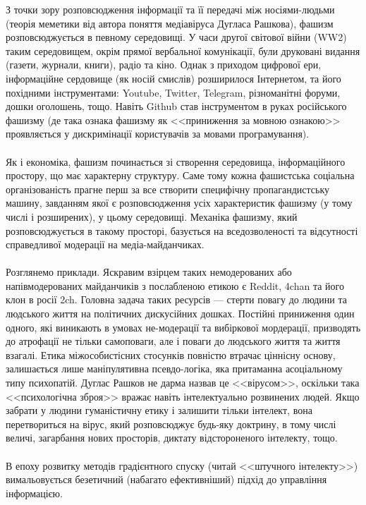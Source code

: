 З точки зору розповсюдження інформації та її передачі між носіями-людьми (теорія
меметики від автора поняття медіавіруса Дугласа Рашкова), фашизм розповсюджується
в певному середовищі. У часи другої світової війни (WW2) таким середовищем, окрім
прямої вербальної комунікації, були друковані видання (газети, журнали, книги),
радіо та кіно. Однак з приходом цифрової ери, інформаційне сердовище (як носій
смислів) розширилося Інтернетом, та його похідними інструментами: Youtube, Twitter,
Telegram, різноманітні форуми, дошки оголошень, тощо. Навіть Github став інструментом
в руках російського фашизму (де така ознака фашизму як <<приниження за мовною ознакою>>
проявляється у дискримінації користувачів за мовами програмування).
\\
\\
Як і економіка, фашизм починається зі створення середовища, інформаційного простору,
що має характерну структуру. Саме тому кожна фашистська соціальна організованість
прагне перш за все створити специфічну пропагандистську машину, завданням якої є
розповсюдження усіх характеристик фашизму (у тому числі і розширених), у цьому
середовищі. Механіка фашизму, який розповсюджується в такому просторі, базується
на вседозволеності та відсутності справедливої модерації на медіа-майданчиках.
\\
\\
Розглянемо приклади. Яскравим взірцем таких немодерованих або напівмодерованих
майданчиків з послабленою етикою є Reddit, 4chan та його клон в росії 2ch.
Головна задача таких ресурсів --- стерти повагу до людини та людського життя
на політичних дискусійних дошках. Постійні приниження один одного, які виникають
в умовах не-модерації та вибіркової мордерації, призводять до атрофації не тільки
самоповаги, але і поваги до людського життя та життя взагалі. Етика міжособистісних
стосунків повністю втрачає ціннісну основу, залишається лише маніпулятивна
псевдо-логіка, яка притаманна асоціальному типу психопатій. Дуглас Рашков
не дарма назвав це <<вірусом>>, оскільки така <<психологічна зброя>> вражає
навіть інтелектуально розвинених людей. Якщо забрати у людини гуманістичну
етику і залишити тільки інтелект, вона перетвориться на вірус, який розповсюджує
будь-яку доктрину, в тому числі величі, загарбання нових просторів, диктату
відстороненого інтелекту, тощо.
\\
\\
В епоху розвитку методів градієнтного спуску (читай <<штучного інтелекту>>)
вимальовується безетичний (набагато ефективніший) підхід до управління інформацією.
